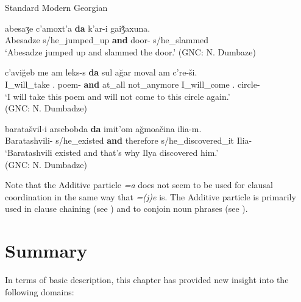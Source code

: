 \begin{exe}
	\ex\label{chain-ex06}
	Standard Modern Georgian
    \begin{xlist}
		
		
			\ex\label{chain-ex06a}
			\gll  abesaʒe c'amoxt'a \textbf{da} k'ar-i gaiǯaxuna. \\
			Abesadze s/he\_jumped\_up \textbf{and} door-{\Nom} s/he\_slammed \\
			\trans `Abesadze jumped up and slammed the door.'
			\hfill (GNC: N. Dumbaze)
		
		
		
			\ex\label{chain-ex06b}
			\gll c'avi\u{g}eb me am leks-s \textbf{da} sul a\u{g}ar moval am c're-ši. \\
			I\_will\_take {\Fsg} {\Prox}.{\Obl} poem-{\Dat} \textbf{and} at\_all not\_anymore I\_will\_come {\Prox}.{\Obl} circle-{\In}\\
			\trans `I will take this poem and will not come to this circle again.' \\
			\hfill (GNC: N. Dumbadze)
		
		
		
			\ex\label{chain-ex06c}
			\gll  baratašvil-i arsebobda \textbf{da} imit'om a\u{g}moačina ilia-m. \\
			Baratashvili-{\Nom} s/he\_existed \textbf{and} therefore s/he\_discovered\_it Ilia-{\Erg} \\
			\trans `Baratashvili existed and that's why Ilya discovered him.' \\
			\hfill (GNC: N. Dumbadze)
		
		
	\end{xlist}
\end{exe}

Note that the Additive particle \textit{=a} does not seem to be used for clausal coordination in the same way that \textit{=(j)e} is. The Additive particle is primarily used in clause chaining (see ) and to conjoin noun phrases (see ).

\section{Summary}




In terms of basic description, this chapter has provided new insight into the following domains:

